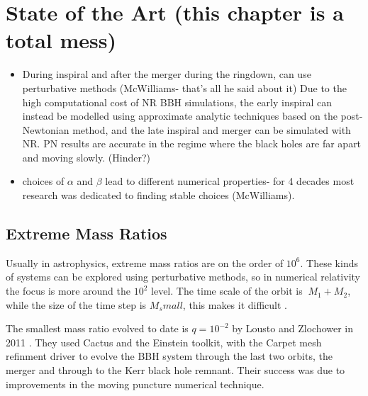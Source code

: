 %
%
%

\chapter{State of the Art (this chapter is a total mess)}

\begin{itemize}
\item During inspiral and after the merger during the ringdown, can use perturbative methods (McWilliams- that's all he said about it) Due to the high computational cost of NR BBH simulations, the early inspiral can instead be modelled using approximate analytic techniques based on the post- Newtonian method, and the late inspiral and merger can be simulated with NR. PN results are accurate in the regime where the black holes are far apart and moving slowly. (Hinder?)
\item choices of $\alpha$ and $\beta$ lead to different numerical properties- for 4 decades most research was dedicated to finding stable choices (McWilliams). 
\end{itemize}

\section{Extreme Mass Ratios}
Usually in astrophysics, extreme mass ratios are on the order of $10^{6}$. These kinds of systems can be explored using perturbative methods, so in numerical relativity the focus is more around the $10^2$ level. The time scale of the orbit is $~M_1+M_2$, while the size of the time step is $M_small$, this makes it difficult \cite{Scheel2013}. 

The smallest mass ratio evolved to date is $q=10^{-2}$ by Lousto and Zlochower in 2011 \cite{LoustoZloch2011}. They used Cactus and the Einstein toolkit, with the Carpet mesh refinment driver to evolve the BBH system through the last two orbits, the merger and through to the Kerr black hole remnant. Their success was due to improvements in the moving puncture numerical technique.  

